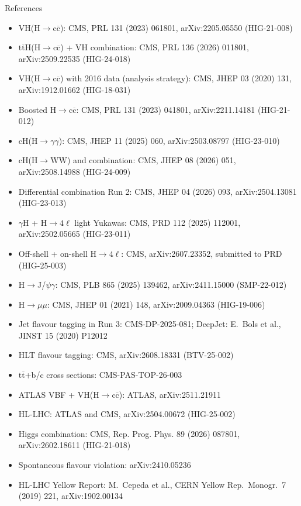 \documentclass[aspectratio=169,10pt,xcolor=table]{beamer}
\newcommand{\qbar}[1]{\mathrm{#1}\overline{\mathrm{#1}}}
\newcommand{\Hcc}{\ensuremath{\mathrm{H}\to\qbar{c}}}
\newcommand{\ttH}{\ensuremath{\qbar{t}\mathrm{H}}}
\newcommand{\ttbar}{\ensuremath{\qbar{t}}}
\newcommand{\up}{\vspace*{-0.8em}}
\begin{document}
\begin{frame}[t]{References}
  \up
  \scriptsize
  \begin{itemize}\setlength\itemsep{0pt}
    \item VH(\Hcc): CMS, PRL 131 (2023) 061801, arXiv:2205.05550 (HIG-21-008)
    \item \ttH(\Hcc) + VH combination: CMS, PRL 136 (2026) 011801, arXiv:2509.22535 (HIG-24-018)
    \item VH(\Hcc) with 2016 data (analysis strategy): CMS, JHEP 03 (2020) 131, arXiv:1912.01662 (HIG-18-031)
    \item Boosted \Hcc: CMS, PRL 131 (2023) 041801, arXiv:2211.14181 (HIG-21-012)
    \item cH(H$\to\gamma\gamma$): CMS, JHEP 11 (2025) 060, arXiv:2503.08797 (HIG-23-010)
    \item cH(H$\to$WW) and combination: CMS, JHEP 08 (2026) 051, arXiv:2508.14988 (HIG-24-009)
    \item Differential combination Run 2: CMS, JHEP 04 (2026) 093, arXiv:2504.13081 (HIG-23-013)
    \item $\gamma$H + H$\to4\ell$ light Yukawas: CMS, PRD 112 (2025) 112001, arXiv:2502.05665 (HIG-23-011)
    \item Off-shell + on-shell H$\to4\ell$: CMS, arXiv:2607.23352, submitted to PRD (HIG-25-003)
    \item H$\to$J/$\psi\gamma$: CMS, PLB 865 (2025) 139462, arXiv:2411.15000 (SMP-22-012)
    \item H$\to\mu\mu$: CMS, JHEP 01 (2021) 148, arXiv:2009.04363 (HIG-19-006)
    \item Jet flavour tagging in Run 3: CMS-DP-2025-081; DeepJet: E.~Bols et al., JINST 15 (2020) P12012
    \item HLT flavour tagging: CMS, arXiv:2608.18331 (BTV-25-002)
    \item \ttbar+b/c cross sections: CMS-PAS-TOP-26-003
    \item ATLAS VBF + VH(\Hcc): ATLAS, arXiv:2511.21911
    \item HL-LHC: ATLAS and CMS, arXiv:2504.00672 (HIG-25-002)
    \item Higgs combination: CMS, Rep. Prog. Phys. 89 (2026) 087801, arXiv:2602.18611 (HIG-21-018)
    \item Spontaneous flavour violation: arXiv:2410.05236
    \item HL-LHC Yellow Report: M.~Cepeda et al., CERN Yellow Rep.\ Monogr.\ 7 (2019) 221, arXiv:1902.00134
  \end{itemize}
\end{frame}
\end{document}
